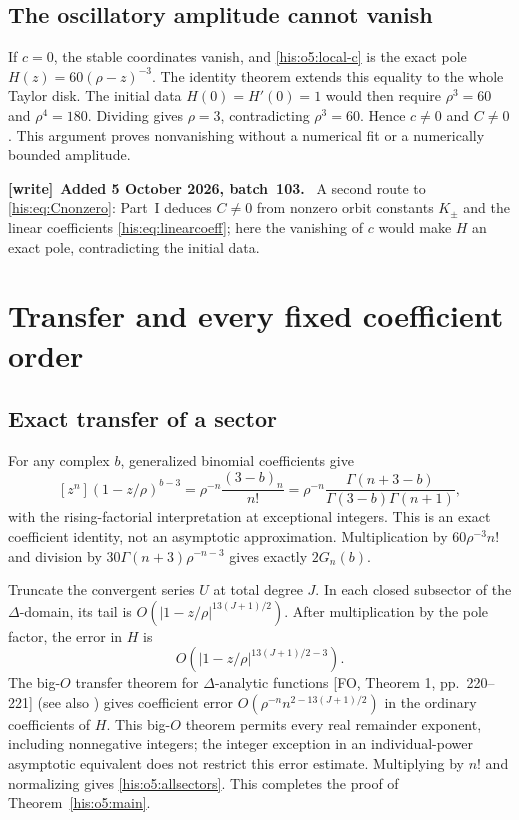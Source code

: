 \documentclass[11pt]{article}
\theoremstyle{remark}\newtheorem{remark}[theorem]{Remark}
\numberwithin{equation}{section}
\newenvironment{writenote}[1][]{\par\smallskip\begingroup\small
 \noindent\textbf{[write]}\if\relax\detokenize{#1}\relax\else~\textbf{#1.}\fi\ }%
 {\par\endgroup\smallskip}
\begin{document}
\subsection{The oscillatory amplitude cannot vanish}
If $c=0$, the stable coordinates vanish, and \eqref{his:o5:local-c} is the exact
pole $H(z)=60(\rho-z)^{-3}$. The identity theorem extends this equality to
the whole Taylor disk. The initial data $H(0)=H'(0)=1$ would then require
$\rho^3=60$ and $\rho^4=180$. Dividing gives $\rho=3$, contradicting
$\rho^3=60$. Hence $c\ne0$ and $C\ne0$.
This argument proves nonvanishing without a numerical fit or a
numerically bounded amplitude.
\begin{writenote}[Added 5 October 2026, batch~103]
A second route to \eqref{his:eq:Cnonzero}: Part~I deduces $C\ne0$ from nonzero orbit constants $K_\pm$ and the linear coefficients \eqref{his:eq:linearcoeff}; here the vanishing of $c$ would make $H$ an exact pole, contradicting the initial data.
\end{writenote}


\section{Transfer and every fixed coefficient order}\label{his:o5:transfer}
\subsection{Exact transfer of a sector}
For any complex $b$, generalized binomial coefficients give
\begin{equation}\label{his:o5:binom}
[z^n](1-z/\rho)^{b-3}
=\rho^{-n}\frac{(3-b)_n}{n!}
=\rho^{-n}\frac{\Gamma(n+3-b)}{\Gamma(3-b)\Gamma(n+1)},
\end{equation}
with the rising-factorial interpretation at exceptional integers.
This is an exact coefficient identity, not an asymptotic approximation.
Multiplication by $60\rho^{-3}n!$ and division by
$30\Gamma(n+3)\rho^{-n-3}$ gives exactly $2G_n(b)$.

Truncate the convergent series $U$ at total degree $J$. In each closed
subsector of the $\Delta$-domain, its tail is
$O(|1-z/\rho|^{13(J+1)/2})$. After multiplication by the pole factor,
the error in $H$ is
\[
O\!\left(|1-z/\rho|^{13(J+1)/2-3}\right).
\]
The big-$O$ transfer theorem for $\Delta$-analytic functions
[FO, Theorem 1, pp.~220--221] (see also
\cite[Chapter VI, Theorem VI.3]{fs2009}) gives coefficient error
$O(\rho^{-n}n^{2-13(J+1)/2})$ in the ordinary coefficients of $H$.
This big-$O$ theorem permits every real remainder exponent, including
nonnegative integers; the integer exception in an individual-power
asymptotic equivalent does not restrict this error estimate.
Multiplying by $n!$ and normalizing gives \eqref{his:o5:allsectors}.
This completes the proof of Theorem~\ref{his:o5:main}.
\end{document}
